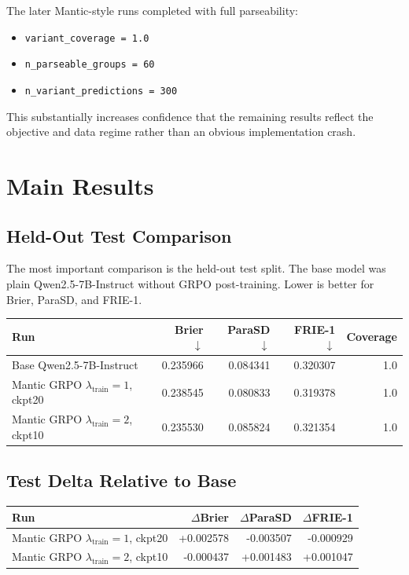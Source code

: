 \documentclass[11pt]{article}
\begin{document}
The later Mantic-style runs completed with full parseability:

\begin{itemize}
  \item \texttt{variant\_coverage = 1.0}
  \item \texttt{n\_parseable\_groups = 60}
  \item \texttt{n\_variant\_predictions = 300}
\end{itemize}

This substantially increases confidence that the remaining results reflect the
objective and data regime rather than an obvious implementation crash.

\section{Main Results}

\subsection{Held-Out Test Comparison}

The most important comparison is the held-out test split. The base model was
plain Qwen2.5-7B-Instruct without GRPO post-training. Lower is better for Brier,
ParaSD, and FRIE-1.

\begin{center}
\begin{tabular}{lrrrr}
\toprule
Run & Brier $\downarrow$ & ParaSD $\downarrow$ & FRIE-1 $\downarrow$ & Coverage \\
\midrule
Base Qwen2.5-7B-Instruct & 0.235966 & 0.084341 & 0.320307 & 1.0 \\
Mantic GRPO $\lambda_{\mathrm{train}}=1$, ckpt20 & 0.238545 & 0.080833 & 0.319378 & 1.0 \\
Mantic GRPO $\lambda_{\mathrm{train}}=2$, ckpt10 & 0.235530 & 0.085824 & 0.321354 & 1.0 \\
\bottomrule
\end{tabular}
\end{center}

\subsection{Test Delta Relative to Base}

\begin{center}
\begin{tabular}{lrrr}
\toprule
Run & $\Delta$Brier & $\Delta$ParaSD & $\Delta$FRIE-1 \\
\midrule
Mantic GRPO $\lambda_{\mathrm{train}}=1$, ckpt20 & +0.002578 & -0.003507 & -0.000929 \\
Mantic GRPO $\lambda_{\mathrm{train}}=2$, ckpt10 & -0.000437 & +0.001483 & +0.001047 \\
\bottomrule
\end{tabular}
\end{center}
\end{document}
